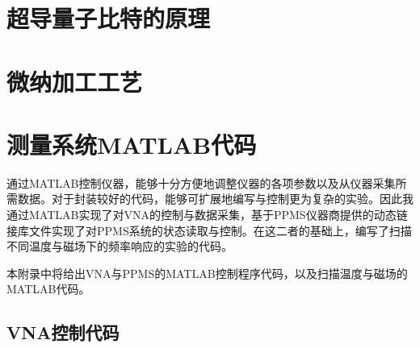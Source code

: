 
\chapter{超导量子比特的原理} %
\label{cha:SCQubitPrinciple}
  


\chapter{微纳加工工艺} %
\label{cha:fabrication}
  

\chapter{测量系统MATLAB代码} %
\label{cha:measurement_code}

通过MATLAB控制仪器，能够十分方便地调整仪器的各项参数以及从仪器采集所需数据。对于封装较好的代码，能够可扩展地编写与控制更为复杂的实验。因此我通过MATLAB实现了对VNA的控制与数据采集，基于PPMS仪器商提供的动态链接库文件实现了对PPMS系统的状态读取与控制。在这二者的基础上，编写了扫描不同温度与磁场下的频率响应的实验的代码。

本附录中将给出VNA与PPMS的MATLAB控制程序代码，以及扫描温度与磁场的MATLAB代码。


  \section{VNA控制代码} %
  \label{sec:vna控制代码}

